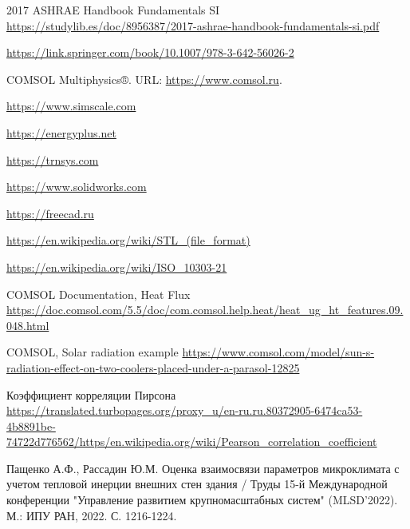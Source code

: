 \documentclass[a4paper,article,14pt]{extarticle}
\begin{document}


\tableofcontents
\pagebreak










\newpage
\begin{thebibliography}{1}
 2017 ASHRAE Handbook Fundamentals SI \\
\url{https://studylib.es/doc/8956387/2017-ashrae-handbook-fundamentals-si.pdf}

 \url{https://link.springer.com/book/10.1007/978-3-642-56026-2}

 COMSOL Multiphysics®﻿. URL: \url{https://www.comsol.ru}.

 \url{https://www.simscale.com}

 \url{https://energyplus.net}

 \url{https://trnsys.com}

 \url{https://www.solidworks.com}

 \url{https://freecad.ru}

 \url{https://en.wikipedia.org/wiki/STL_(file_format)}

 \url{https://en.wikipedia.org/wiki/ISO_10303-21}

 COMSOL Documentation, Heat Flux \url{https://doc.comsol.com/5.5/doc/com.comsol.help.heat/heat_ug_ht_features.09.048.html}

 COMSOL, Solar radiation example \url{https://www.comsol.com/model/sun-s-radiation-effect-on-two-coolers-placed-under-a-parasol-12825}

 Коэффициент корреляции Пирсона \url{https://translated.turbopages.org/proxy_u/en-ru.ru.80372905-6474ca53-4b8891be-74722d776562/https/en.wikipedia.org/wiki/Pearson_correlation_coefficient}

 Пащенко А.Ф., Рассадин Ю.М. Оценка взаимосвязи параметров микроклимата с учетом тепловой инерции внешних стен здания / Труды 15-й Международной конференции "Управление развитием крупномасштабных систем" (MLSD’2022). М.: ИПУ РАН, 2022. С. 1216-1224.


\end{thebibliography}
\end{document}

